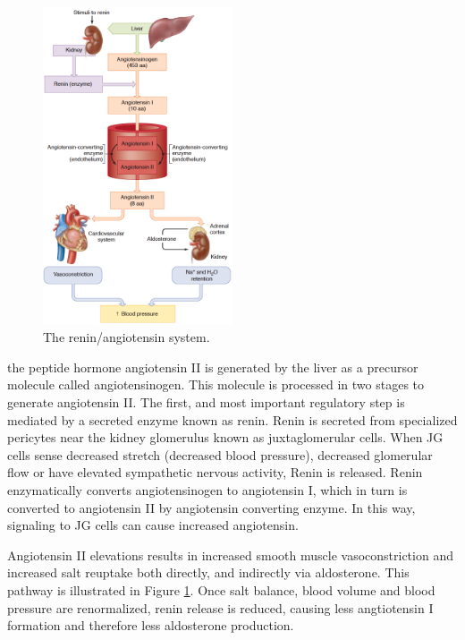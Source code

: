 \documentclass{tufte-handout}
\begin{document}
\begin{figure}
\centering
  \includegraphics[width=0.5\textwidth]{figures/renin-angiotensin}
  \caption{The renin/angiotensin system.}
    \label{fig:renin-angiotensin}
\end{figure}

 the peptide hormone angiotensin II is generated by the liver as a precursor molecule called angiotensinogen.  This molecule is processed in two stages to generate angiotensin II.  The first, and most important regulatory step is mediated by a secreted enzyme known as renin.  Renin is secreted from specialized pericytes near the kidney glomerulus known as juxtaglomerular cells.  When JG cells sense decreased stretch (decreased blood pressure), decreased glomerular flow or have elevated sympathetic nervous activity, Renin is released.  Renin enzymatically converts angiotensinogen to angiotensin I, which in turn is converted to angiotensin II by angiotensin converting enzyme.  In this way, signaling to JG cells can cause increased angiotensin.  

Angiotensin II elevations results in increased smooth muscle vasoconstriction and increased salt reuptake both directly, and indirectly via aldosterone.  This pathway is illustrated in Figure \ref{fig:renin-angiotensin}.  Once salt balance, blood volume and blood pressure are renormalized, renin release is reduced, causing less angtiotensin I formation and therefore less aldosterone production.
\end{document}
